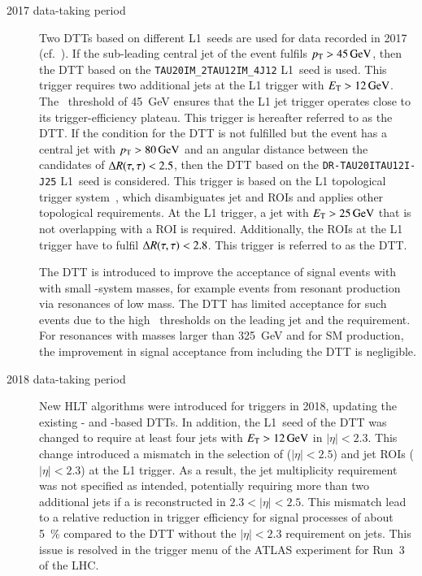 \begin{description}
\item[2017 data-taking period] Two DTTs based on different L1~seeds are used for
  data recorded in 2017 (cf.~). If the sub-leading
  central jet of the event fulfils $p_{\text{T}} > \SI{45}{\ensuremath{\text{GeV}}}$, then the DTT based on
  the \texttt{TAU20IM\_2TAU12IM\_4J12} L1~seed is used. This trigger requires
  two additional jets at the L1 trigger with $\ET > \SI{12}{\GeV}$. The
  \pT~threshold of \SI{45}{\GeV} ensures that the L1 jet trigger operates close
  to its trigger-efficiency plateau. This trigger is hereafter referred to as
  the \FourJTwelve DTT. If the condition for the \FourJTwelve DTT is not
  fulfilled but the event has a central jet with $\pT > \SI{80}{\GeV}$ and an
  angular distance between the \tauhadvis candidates of $\Delta R(\tau, \tau) < 2.5$, then
  the DTT based on the \texttt{DR-TAU20ITAU12I-J25} L1~seed is considered. This
  trigger is based on the L1 topological trigger system~\cite{TRIG-2019-02},
  which disambiguates jet and \tauhadvis ROIs and applies other topological
  requirements. At the L1 trigger, a jet with $E_{\text{T}} > \SI{25}{\ensuremath{\text{GeV}}}$ that is not
  overlapping with a \tauhadvis ROI is required. Additionally, the \tauhadvis
  ROIs at the L1 trigger have to fulfil $\Delta R(\tau, \tau) < 2.8$. This trigger is
  referred to as the \LOneTopo DTT.

  The \FourJTwelve DTT is introduced to improve the acceptance of signal events
  with with small \HH-system masses, for example events from resonant \HH
  production via resonances of low mass. The \LOneTopo DTT has limited
  acceptance for such events due to the high \pT~thresholds on the leading jet
  and the \dRtautau requirement. For resonances with masses larger than
  \SI{325}{\GeV} and for SM \HH production, the improvement in signal acceptance
  from including the \FourJTwelve DTT is negligible.

\item[2018 data-taking period] New HLT algorithms were introduced for \tauhadvis
  triggers in 2018, updating the existing \LOneTopo- and \FourJTwelve-based
  DTTs. In addition, the L1~seed of the \FourJTwelve DTT was changed to require
  at least four jets with $\ET > \SI{12}{\GeV}$ in $|\eta| < 2.3$. This change
  introduced a mismatch in the selection of \tauhadvis ($|\eta| < 2.5$) and jet
  ROIs ($|\eta| < 2.3$) at the L1 trigger. As a result, the jet multiplicity
  requirement was not specified as intended, potentially requiring more than two
  additional jets if a \tauhadvis is reconstructed in $2.3 < |\eta| < 2.5$. This
  mismatch lead to a relative reduction in trigger efficiency for signal
  processes of about \SI{5}{\percent} compared to the \FourJTwelve DTT without
  the $|\eta| < 2.3$ requirement on jets. This issue is resolved in the trigger
  menu of the ATLAS experiment for Run~3 of the LHC.
\end{description}


